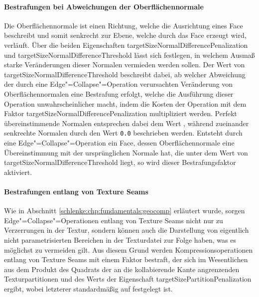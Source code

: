 \paragraph{Bestrafungen bei Abweichungen der Oberflächennormale} Die Oberflächennormale ist einen Richtung, welche die Ausrichtung eines Face beschreibt und somit senkrecht zur Ebene, welche durch das Face erzeugt wird, verläuft. Über die beiden Eigenschaften {\ttfamily target\-Size\-Normal\-Difference\-Penalization} und {\ttfamily target\-Size\-Normal\-Difference\-Threshold} lässt sich festlegen, in welchem Ausmaß starke Veränderungen dieser Normalen vermieden werden sollen. Der Wert von {\ttfamily target\-Size\-Normal\-Difference\-Threshold} beschreibt dabei, ab welcher Abweichung der durch eine Edge"=Collapse"=Operation verursachten Veränderung von Oberflächennormalen eine Bestrafung erfolgt, welche die Ausführung dieser Operation unwahrscheinlicher macht, indem die Kosten der Operation mit dem Faktor {\ttfamily target\-Size\-Normal\-Difference\-Penalization} multipliziert werden. Perfekt übereinstimmende Normalen entsprechen dabei dem Wert {}, während zueinander senkrechte Normalen durch den Wert {\lstinline|0.0|} beschrieben werden. Entsteht durch eine Edge"=Collapse"=Operation ein Face, dessen Oberflächennormale eine Übereinstimmung mit der ursprünglichen Normale hat, die unter dem Wert von {\ttfamily target\-Size\-Normal\-Difference\-Threshold} liegt, so wird dieser Bestrafungsfaktor aktiviert.

\paragraph{Bestrafungen entlang von Texture Seams} Wie in Abschnitt \ref{schlenke:chp:fundamentals:geocomp} erläutert wurde, sorgen Edge"=Collapse"=Operationen entlang von Texture Seams nicht nur zu Verzerrungen in der Textur, sondern können auch die Darstellung von eigentlich nicht parametrisierten Bereichen in der Texturdatei zur Folge haben, was es möglichst zu vermeiden gilt. Aus diesem Grund werden Kompressionsoperationen entlang von Texture Seams mit einem Faktor bestraft, der sich im Wesentlichen aus dem Produkt des Quadrats der an die kollabierende Kante angrenzenden Texturpartitionen und des Werts der Eigenschaft {\ttfamily target\-Size\-Partition\-Penalization} ergibt, wobei letzterer standardmäßig auf {} festgelegt ist.

